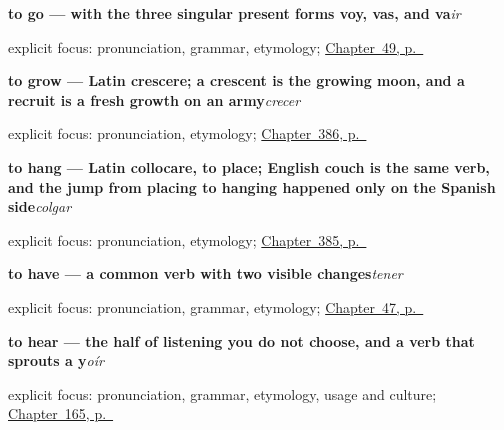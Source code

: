 \noindent\begin{minipage}[t]{\linewidth}
\raggedright
\textbf{to go — with the three singular present forms voy, vas, and va}\enspace\emph{ir}\par
\footnotesize explicit focus: pronunciation, grammar, etymology; \hyperref[ch:ir-y-futuro]{Chapter~49, p.~\pageref*{ch:ir-y-futuro}}
\end{minipage}\par\smallskip

\noindent\begin{minipage}[t]{\linewidth}
\raggedright
\textbf{to grow — Latin crescere; a crescent is the growing moon, and a recruit is a fresh growth on an army}\enspace\emph{crecer}\par
\footnotesize explicit focus: pronunciation, etymology; \hyperref[ch:vender-y-servir]{Chapter~386, p.~\pageref*{ch:vender-y-servir}}
\end{minipage}\par\smallskip

\noindent\begin{minipage}[t]{\linewidth}
\raggedright
\textbf{to hang — Latin collocare, to place; English couch is the same verb, and the jump from placing to hanging happened only on the Spanish side}\enspace\emph{colgar}\par
\footnotesize explicit focus: pronunciation, etymology; \hyperref[ch:usar-y-tocar]{Chapter~385, p.~\pageref*{ch:usar-y-tocar}}
\end{minipage}\par\smallskip

\noindent\begin{minipage}[t]{\linewidth}
\raggedright
\textbf{to have — a common verb with two visible changes}\enspace\emph{tener}\par
\footnotesize explicit focus: pronunciation, grammar, etymology; \hyperref[ch:numbers-and-age]{Chapter~47, p.~\pageref*{ch:numbers-and-age}}
\end{minipage}\par\smallskip

\noindent\begin{minipage}[t]{\linewidth}
\raggedright
\textbf{to hear — the half of listening you do not choose, and a verb that sprouts a y}\enspace\emph{oír}\par
\footnotesize explicit focus: pronunciation, grammar, etymology, usage and culture; \hyperref[ch:spanish-hear-sleep-walk-run]{Chapter~165, p.~\pageref*{ch:spanish-hear-sleep-walk-run}}
\end{minipage}\par\smallskip


